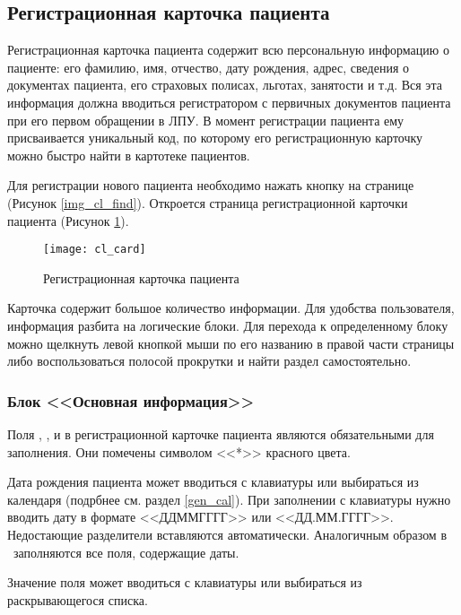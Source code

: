 {
\subsection{Регистрационная карточка пациента} \label{cl_card}

Регистрационная карточка пациента содержит всю персональную информацию о пациенте: его фамилию, имя, отчество, дату рождения, адрес, сведения о документах пациента, его страховых полисах, льготах, занятости и т.д. Вся эта информация должна вводиться регистратором с первичных документов пациента при его первом обращении в ЛПУ. В момент регистрации пациента ему присваивается уникальный код, по которому его регистрационную карточку можно быстро найти в картотеке пациентов.

Для регистрации нового пациента необходимо нажать  кнопку  на странице  (Рисунок \ref{img_cl_find}). Откроется страница регистрационной карточки пациента (Рисунок \ref{img_cl_card}). 

\begin{figure}[!ht]\centering
 \texttt{[image: cl\_card]}
 \caption{Регистрационная карточка пациента}
 \label{img_cl_card}
\end{figure} 

Карточка содержит большое количество информации. Для удобства пользователя, информация разбита на логические блоки. Для перехода к определенному блоку можно щелкнуть левой кнопкой мыши по его названию в правой части страницы либо воспользоваться полосой прокрутки и найти раздел самостоятельно.  

\subsubsection{Блок <<Основная информация>>}

Поля , ,  и  в регистрационной карточке пациента являются обязательными для заполнения. Они помечены символом <<*>> красного цвета.

Дата рождения пациента может вводиться  с клавиатуры или выбираться из календаря (подрбнее см. раздел \ref{gen_cal}). При заполнении с клавиатуры нужно вводить дату в формате <<ДДММГГГГ>> или <<ДД.ММ.ГГГГ>>. Недостающие разделители вставляются автоматически. Аналогичным образом в \tmisp~заполняются все поля, содержащие даты.

Значение поля  может вводиться с клавиатуры или выбираться из раскрывающегося списка. 

}
